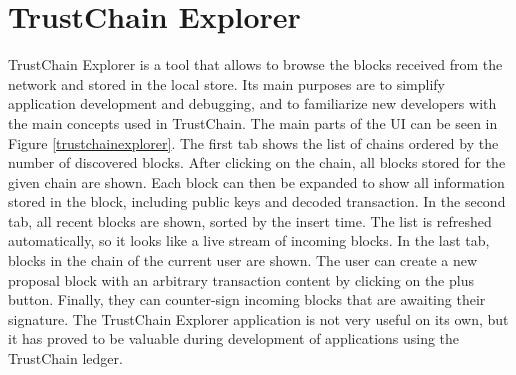 





\section{TrustChain Explorer}

TrustChain Explorer is a tool that allows to browse the blocks received from the network and stored in the local store. Its main purposes are to simplify application development and debugging, and to familiarize new developers with the main concepts used in TrustChain. The main parts of the UI can be seen in Figure \ref{trustchainexplorer}. The first tab shows the list of chains ordered by the number of discovered blocks. After clicking on the chain, all blocks stored for the given chain are shown. Each block can then be expanded to show all information stored in the block, including public keys and decoded transaction. In the second tab, all recent blocks are shown, sorted by the insert time. The list is refreshed automatically, so it looks like a live stream of incoming blocks. In the last tab, blocks in the chain of the current user are shown. The user can create a new proposal block with an arbitrary transaction content by clicking on the plus button. Finally, they can counter-sign incoming blocks that are awaiting their signature. The TrustChain Explorer application is not very useful on its own, but it has proved to be valuable during development of applications using the TrustChain ledger.

